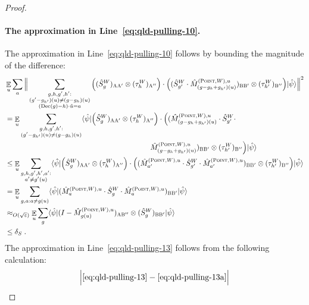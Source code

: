 \documentclass[11pt]{article}
\theoremstyle{definition}
\newcommand{\ket}[1]{|#1\rangle}
\newcommand{\bra}[1]{\langle#1|}
\newcommand{\Id}{\ensuremath{I}}
\newcommand{\eps}{\varepsilon}
\newcommand{\E}{\mathop{\mathbb{E}}\displaylimits}
\newcommand{\labelstyle}[1]{\ensuremath{\textsc{#1}}\xspace}
\newcommand{\alice}{\labelstyle{A}}
\newcommand{\bob}{\labelstyle{B}}
\newcommand{\typestyle}[1]{\ensuremath{\textsc{#1}}\xspace}
\newcommand{\Point}{\typestyle{Point}}
\newcommand{\coded}{\mathrm{Dec}}
\begin{document}
\begin{proof}
		\paragraph{The approximation in Line~\eqref{eq:qld-pulling-10}.} The approximation in Line~\eqref{eq:qld-pulling-10} follows by bounding the magnitude of the difference:	
\begin{align}
		&\E_u \sum_a \Big \| \sum_{\substack{g,h,g',h': \\ (g' - g_{h'})(u) \neq (g -g_h)(u) \\ (\coded(g)-h)\cdot \tilde{u} = a}} \Big((\hat{S}^W_g)_{\alice \alice'} \otimes (\tau_h^W)_{\alice''} \Big) \cdot \Big( (\hat{S}^W_{g'} \cdot \hat{M}^{(\Point,W),u}_{(g-g_h+g_{h'})(u)})_{\bob \bob'} \otimes (\tau_{h'}^W)_{\bob''} \Big) \ket{\hat{\psi}} \Big \|^2 \notag \\
&= \E_u \sum_{\substack{g,h,g',h': \\ (g' - g_{h'})(u) \neq (g -g_h)(u)}} \bra{\hat{\psi}} \Big(\hat{S}^W_g)_{\alice \alice'} \otimes (\tau_h^W)_{\alice''} \Big) \cdot \Big( (\hat{M}^{(\Point,W),u}_{(g-g_h+g_{h'})(u)} \cdot \hat{S}^W_{g'} \cdot \notag\\
      &\hspace{20em}\hat{M}^{(\Point,W),u}_{(g-g_h+g_{h'})(u)})_{\bob \bob'} \otimes (\tau_{h'}^W)_{\bob''} \Big) \ket{\hat{\psi}} \notag \\
		&\leq \E_u \sum_{\substack{g,h,g',h',a': \\ a' \neq g'(u)}} \bra{\hat{\psi}} \Big(\hat{S}^W_g)_{\alice \alice'} \otimes (\tau_h^W)_{\alice''} \Big) \cdot \Big( (\hat{M}^{(\Point,W),u}_{a'} \cdot \hat{S}^W_{g'} \cdot \hat{M}^{(\Point,W),u}_{a'})_{\bob \bob'} \otimes (\tau_{h'}^W)_{\bob''} \Big) \ket{\hat{\psi}} \notag \\
		&= \E_u \sum_{g,a: a \neq g(u)} \bra{\hat{\psi}} (\hat{M}^{(\Point,W),u}_{a} \cdot \hat{S}^W_{g} \cdot \hat{M}^{(\Point,W),u}_{a})_{\bob \bob'} \ket{\hat{\psi}} \label{eq:qld-pulling-13a} \\
		&\approx_{O(\sqrt{\eps})} \E_u \sum_{g} \bra{\hat{\psi}} (\Id - \hat{M}^{(\Point,W),u}_{g(u)})_{\alice \bob''} \otimes ( \hat{S}^W_{g})_{\bob \bob'} \ket{\hat{\psi}}  \label{eq:qld-pulling-13} \\
		&\leq \delta_S \;. \label{eq:qld-pulling-14}
\end{align}
The approximation in Line~\eqref{eq:qld-pulling-13} follows from the following calculation:
\begin{align}
	&\Big | \text{\eqref{eq:qld-pulling-13}} - \text{\eqref{eq:qld-pulling-13a}} \Big | \notag \\

\end{align}
\end{proof}
\end{document}
